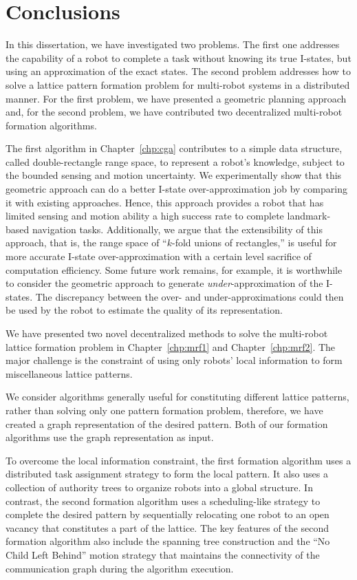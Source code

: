 \chapter{Conclusions}
\label{chp:conc}

In this dissertation, we have investigated two problems. 
The first one addresses the capability of a robot to complete a task without knowing its true I-states, but using an approximation of the exact states.
%
The second problem addresses how to solve a lattice pattern formation problem for multi-robot systems in a distributed manner. 
%
For the first problem, we have presented a geometric planning approach and, for the second problem, we have contributed two decentralized multi-robot formation algorithms.


The first algorithm in Chapter~\ref{chp:cga} contributes to a simple data structure, called double-rectangle range space, to represent a robot's knowledge, subject to the bounded sensing and motion uncertainty. 
%
We experimentally show that this geometric approach can do a better I-state over-approximation job by comparing it with existing approaches. 
%
Hence, this approach provides a robot that has limited sensing and motion ability a high success rate to complete landmark-based navigation tasks.
%
Additionally, we argue that the extensibility of this approach, that is, the range space of ``$k$-fold unions of rectangles,'' is useful for more accurate I-state over-approximation with a certain level sacrifice of computation efficiency.
%
Some future work remains, 
for example, it is worthwhile to consider the geometric approach to
generate \emph{under}-approximation of the I-states.  
%
The discrepancy between the over- and under-approximations could then be used by the robot to estimate the quality of its representation.

We have presented two novel decentralized methods to solve the multi-robot lattice formation problem in Chapter~\ref{chp:mrf1} and Chapter~\ref{chp:mrf2}. 
%
The major challenge is the constraint of using only robots' local information to form miscellaneous lattice patterns.  

We consider algorithms generally useful for constituting different lattice patterns, rather than solving only one pattern formation problem, therefore, we have created a graph representation of the desired pattern.
%
Both of our formation algorithms use the graph representation as input.


To overcome the local information constraint, the first formation algorithm uses a distributed task assignment strategy to form the local pattern. 
%
It also uses a collection of authority trees to organize robots into a global structure.
%
In contrast, the second formation algorithm uses a scheduling-like strategy to complete the desired pattern by sequentially relocating one robot to an open vacancy that constitutes a part of the lattice. 
%
The key features of the second formation algorithm also include the spanning tree construction and the ``No Child Left Behind'' motion strategy that maintains the connectivity of the communication graph during the algorithm execution.

